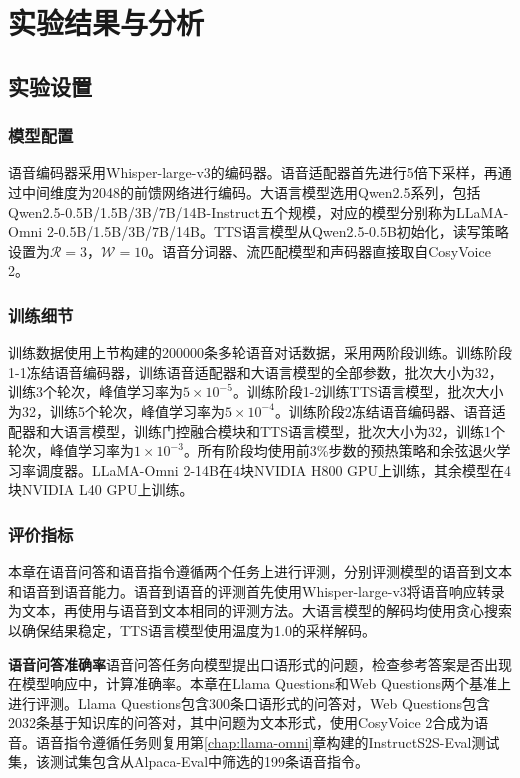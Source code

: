 \section{实验结果与分析}

\subsection{实验设置}

\subsubsection{模型配置}

语音编码器采用Whisper-large-v3的编码器。语音适配器首先进行5倍下采样，再通过中间维度为2048的前馈网络进行编码。大语言模型选用Qwen2.5系列，包括Qwen2.5-0.5B/1.5B/3B/7B/14B-Instruct五个规模，对应的模型分别称为LLaMA-Omni 2-0.5B/1.5B/3B/7B/14B。TTS语言模型从Qwen2.5-0.5B初始化，读写策略设置为$\mathcal{R}=3$，$\mathcal{W}=10$。语音分词器、流匹配模型和声码器直接取自CosyVoice 2。

\subsubsection{训练细节}

训练数据使用上节构建的200000条多轮语音对话数据，采用两阶段训练。训练阶段1-1冻结语音编码器，训练语音适配器和大语言模型的全部参数，批次大小为32，训练3个轮次，峰值学习率为$5 \times 10^{-5}$。训练阶段1-2训练TTS语言模型，批次大小为32，训练5个轮次，峰值学习率为$5 \times 10^{-4}$。训练阶段2冻结语音编码器、语音适配器和大语言模型，训练门控融合模块和TTS语言模型，批次大小为32，训练1个轮次，峰值学习率为$1 \times 10^{-3}$。所有阶段均使用前3\%步数的预热策略和余弦退火学习率调度器。LLaMA-Omni 2-14B在4块NVIDIA H800 GPU上训练，其余模型在4块NVIDIA L40 GPU上训练。

\subsubsection{评价指标}

本章在语音问答和语音指令遵循两个任务上进行评测，分别评测模型的语音到文本和语音到语音能力。语音到语音的评测首先使用Whisper-large-v3将语音响应转录为文本，再使用与语音到文本相同的评测方法。大语言模型的解码均使用贪心搜索以确保结果稳定，TTS语言模型使用温度为1.0的采样解码。

\textbf{语音问答准确率}\quad 语音问答任务向模型提出口语形式的问题，检查参考答案是否出现在模型响应中，计算准确率。本章在Llama Questions\citep{nachmani2024spoken}和Web Questions\citep{berant-etal-2013-semantic}两个基准上进行评测。Llama Questions包含300条口语形式的问答对，Web Questions包含2032条基于知识库的问答对，其中问题为文本形式，使用CosyVoice 2合成为语音。语音指令遵循任务则复用第\ref{chap:llama-omni}章构建的InstructS2S-Eval测试集，该测试集包含从Alpaca-Eval中筛选的199条语音指令。

